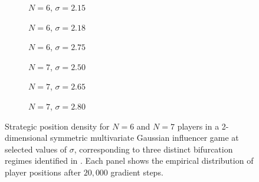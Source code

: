 \documentclass{article}
\begin{document}
    \begin{figure}[ht!]
        \centering
        \begin{subfigure}[b]{0.3\linewidth}
            \centering
                
            \caption{$N=6$, $\sigma=2.15$}\label{fig:2d_agent_density:a}
            \vspace{4ex}
        \end{subfigure}
        \begin{subfigure}[b]{0.3\linewidth}
            \centering
                
            \caption{$N=6$, $\sigma=2.18$}\label{fig:2d_agent_density:b}
            \vspace{4ex}
        \end{subfigure}
        \begin{subfigure}[b]{0.3\linewidth}
            \centering
                
            \caption{$N=6$, $\sigma=2.75$}\label{fig:2d_agent_density:c}
            \vspace{4ex}
        \end{subfigure}

        \begin{subfigure}[b]{0.3\linewidth}
            \centering
                
            \caption{$N=7$, $\sigma=2.50$}\label{fig:2d_agent_density:d}        
            \vspace{4ex}
        \end{subfigure}
        \begin{subfigure}[b]{0.3\linewidth}
            \centering
                
            \caption{$N=7$, $\sigma=2.65$}\label{fig:2d_agent_density:e}
            \vspace{4ex}
        \end{subfigure}
        \begin{subfigure}[b]{0.3\linewidth}
            \centering
                
            \caption{$N=7$, $\sigma=2.80$}\label{fig:2d_agent_density:f}
            \vspace{4ex}
        \end{subfigure}

        \caption{Strategic position density for $N = 6$ and $N = 7$ players in a 2-dimensional symmetric multivariate Gaussian influencer game at selected values of $\sigma$, corresponding to three distinct bifurcation regimes identified in . Each panel shows the empirical distribution of player positions after $20{,}000$ gradient steps. }\label{fig:2d_agent_density}
    \end{figure}
\end{document}
